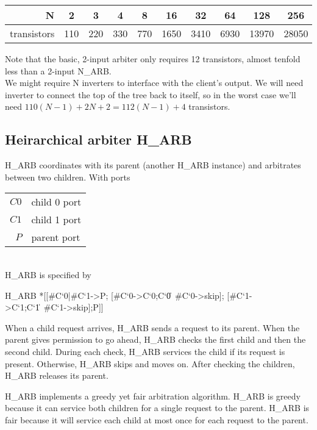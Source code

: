 \documentclass[aer.tex]{subfiles}
\begin{document}
\begin{center}
  \begin{tabular}{|r|c|c|c|c|c|c|c|c|c|}
    \hline
    N & 2 & 3 & 4 & 8 & 16 & 32 & 64 & 128 & 256 \\
    \hline
    transistors & 110 & 220 & 330 & 770 & 1650 & 3410 & 6930 & 13970 & 28050 \\
    \hline
  \end{tabular}
\end{center}

Note that the basic, 2-input arbiter only requires 12 transistors, almost tenfold less than a 2-input N\_ARB. \\
We might require N inverters to interface with the client's output. 
We will need inverter to connect the top of the tree back to itself, 
so in the worst case we'll need $110(N-1)+2N+2=112(N-1)+4$ transistors.

\subsection{Heirarchical arbiter H\_ARB}

H\_ARB coordinates with its parent (another H\_ARB instance) and arbitrates between two children. 
With ports

\begin{tabular}[]{rl}
$C0$ & child 0 port \\
$C1$ & child 1 port \\
$P$ & parent port \\
\end{tabular} \\

\noindent H\_ARB is specified by

\begin{csp}
H_ARB\equiv
  *[[#{C`0}|#{C`1}->P;
    [#{C`0}->C`0;C`0\|~#{C`0}->skip];
    [#{C`1}->C`1;C`1\|~#{C`1}->skip];P]]
\end{csp}

When a child request arrives, H\_ARB sends a request to its parent. When the parent gives permission to go ahead, H\_ARB checks the first child and then the second child. During each check, H\_ARB services the child if its request is present. Otherwise, H\_ARB skips and moves on. After checking the children, H\_ARB releases its parent.

H\_ARB implements a greedy yet fair arbitration algorithm. H\_ARB is greedy because it can service both children for a single request to the parent. H\_ARB is fair because it will service each child at most once for each request to the parent. 
\end{document}

